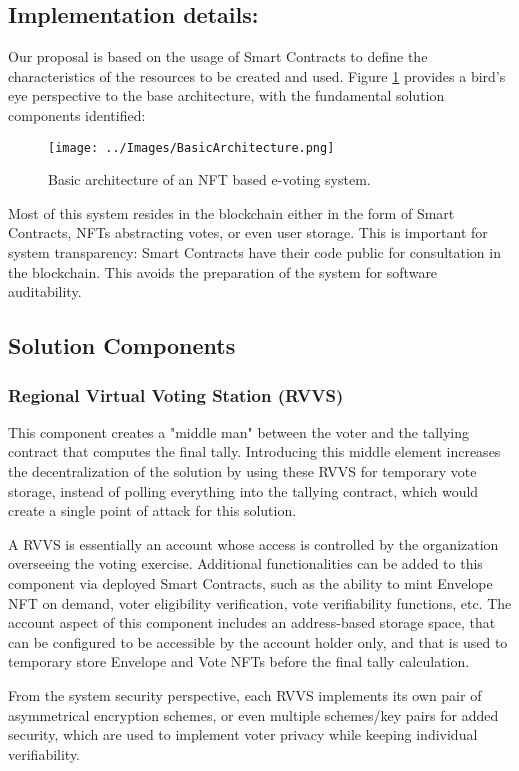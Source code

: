         \subsection{Implementation details:}
        Our proposal is based on the usage of Smart Contracts to define the characteristics of the resources to be created and used. Figure \ref{fig:basic_architecture} provides a bird's eye perspective to the base architecture, with the fundamental solution components identified:
        
        \begin{figure}[htp]
            \centering
            \texttt{[image: ../Images/BasicArchitecture.png]}
            \caption{Basic architecture of an NFT based e-voting system.}
            \label{fig:basic_architecture}
        \end{figure}
        
        Most of this system resides in the blockchain either in the form of Smart Contracts, NFTs abstracting votes, or even user storage. This is important for system transparency: Smart Contracts have their code public for consultation in the blockchain. This avoids the preparation of the system for software auditability.

        \subsection{Solution Components}
        \subsubsection{Regional Virtual Voting Station (RVVS)}
        \label{regional_virtual_voting_stations}
        This component creates a "middle man" between the voter and the tallying contract that computes the final tally. Introducing this middle element increases the decentralization of the solution by using these RVVS for temporary vote storage, instead of polling everything into the tallying contract, which would create a single point of attack for this solution.
        \par
        A RVVS is essentially an account whose access is controlled by the organization overseeing the voting exercise. Additional functionalities can be added to this component via deployed Smart Contracts, such as the ability to mint Envelope NFT on demand, voter eligibility verification, vote verifiability functions, etc. The account aspect of this component includes an address-based storage space, that can be configured to be accessible by the account holder only, and that is used to temporary store Envelope and Vote NFTs before the final tally calculation.  
        \par
        From the system security perspective, each RVVS implements its own pair of asymmetrical encryption schemes, or even multiple schemes/key pairs for added security, which are used to implement voter privacy while keeping individual verifiability.

